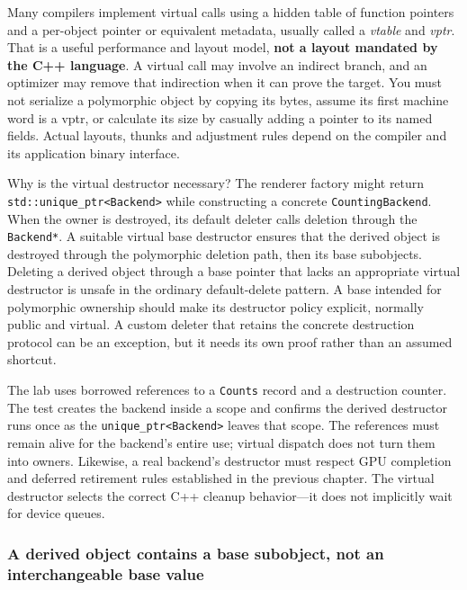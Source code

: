 Many compilers implement virtual calls using a hidden table of function pointers and a per-object pointer or equivalent metadata, usually called a \emph{vtable} and \emph{vptr}. That is a useful performance and layout model, \textbf{not a layout mandated by the C++ language}. A virtual call may involve an indirect branch, and an optimizer may remove that indirection when it can prove the target. You must not serialize a polymorphic object by copying its bytes, assume its first machine word is a vptr, or calculate its size by casually adding a pointer to its named fields. Actual layouts, thunks and adjustment rules depend on the compiler and its application binary interface.

Why is the virtual destructor necessary? The renderer factory might return \texttt{std::unique\_ptr\textless{}Backend\textgreater{}} while constructing a concrete \texttt{CountingBackend}. When the owner is destroyed, its default deleter calls deletion through the \texttt{Backend*}. A suitable virtual base destructor ensures that the derived object is destroyed through the polymorphic deletion path, then its base subobjects. Deleting a derived object through a base pointer that lacks an appropriate virtual destructor is unsafe in the ordinary default-delete pattern. A base intended for polymorphic ownership should make its destructor policy explicit, normally public and virtual. A custom deleter that retains the concrete destruction protocol can be an exception, but it needs its own proof rather than an assumed shortcut.

The lab uses borrowed references to a \texttt{Counts} record and a destruction counter. The test creates the backend inside a scope and confirms the derived destructor runs once as the \texttt{unique\_ptr\textless{}Backend\textgreater{}} leaves that scope. The references must remain alive for the backend's entire use; virtual dispatch does not turn them into owners. Likewise, a real backend's destructor must respect GPU completion and deferred retirement rules established in the previous chapter. The virtual destructor selects the correct C++ cleanup behavior---it does not implicitly wait for device queues.

\subsubsection{A derived object contains a base subobject, not an interchangeable base value}\label{a-derived-object-contains-a-base-subobject-not-an-interchangeable-base-value}

